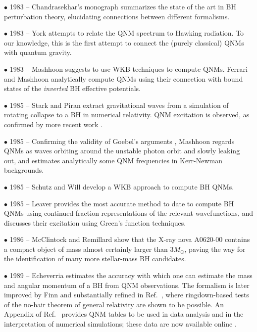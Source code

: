 \documentclass[]{iopart}
\begin{document}
\noindent $\bullet$ 1983 -- Chandrasekhar's monograph \cite{MTB} summarizes the
state of the art in BH perturbation theory, elucidating connections between
different formalisms.

\noindent $\bullet$ 1983 -- York \cite{York:1983zb} attempts to relate the QNM
spectrum to Hawking radiation. To our knowledge, this is the first attempt to
connect the (purely classical) QNMs with quantum gravity.

\noindent $\bullet$ 1983 -- Mashhoon \cite{Mashhoon:1985} suggests to use WKB
techniques to compute QNMs. Ferrari and Mashhoon \cite{Ferrari:1984zz}
analytically compute QNMs using their connection with bound states of the {\em
  inverted} BH effective potentials.

\noindent $\bullet$ 1985 -- Stark and Piran \cite{Stark:1985da} extract
gravitational waves from a simulation of rotating collapse to a BH in
numerical relativity. QNM excitation is observed, as confirmed by more recent
work \cite{Baiotti:2006wm}.

\noindent $\bullet$ 1985 -- Confirming the validity of Goebel's arguments
\cite{goebel}, Mashhoon \cite{mashhoon} regards QNMs as waves orbiting around
the unstable photon orbit and slowly leaking out, and estimates analytically
some QNM frequencies in Kerr-Newman backgrounds.

\noindent $\bullet$ 1985 -- Schutz and Will \cite{Schutz:1985km} develop a WKB
approach to compute BH QNMs.

\noindent $\bullet$ 1985 -- Leaver \cite{Leaver:1985ax,leJMP,Leaver:1986gd}
provides the most accurate method to date to compute BH QNMs using continued
fraction representations of the relevant wavefunctions, and discusses their
excitation using Green's function techniques.

\noindent $\bullet$ 1986 -- McClintock and Remillard \cite{McClintock:1986}
show that the X-ray nova A0620-00 contains a compact object of mass almost
certainly larger than $3M_\odot$, paving the way for the identification of
many more stellar-mass BH candidates. 

\noindent $\bullet$ 1989 -- Echeverria \cite{Echeverria:1989hg} estimates the
accuracy with which one can estimate the mass and angular momentum of a BH
from QNM observations. The formalism is later improved by Finn
\cite{Finn:1992wt} and substantially refined in Ref.~\cite{Berti:2005ys},
where ringdown-based tests of the no-hair theorem of general relativity are
shown to be possible. An Appendix of Ref.~\cite{Berti:2005ys} provides QNM
tables to be used in data analysis and in the interpretation of numerical
simulations; these data are now available online \cite{rdweb}.
\end{document}
